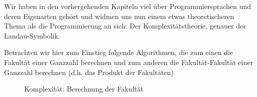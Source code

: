 Wir haben in den vorhergehenden Kapiteln viel über Programmiersprachen und deren Eigenarten gehört und widmen uns nun einem etwas theoretischeren Thema als die Programmierung an sich: Der Komplexitätstheorie, genauer der Landau-Symbolik.

Betrachten wir hier zum Einstieg folgende Algorithmen, die zum einen die Fakultät einer Ganzzahl berechnen und zum anderen die Fakultät-Fakultät einer Ganzzahl berechnen (d.h. das Produkt der Fakultäten)
\begin{figure}[H]
	\centering
	\caption{Komplexität: Berechnung der Fakultät}
\end{figure}

